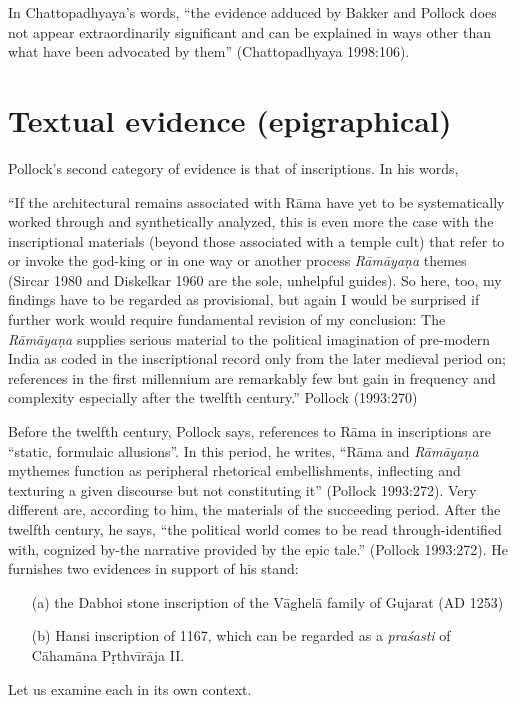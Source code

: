 In Chattopadhyaya’s words, “the evidence adduced by Bakker and Pollock does not appear extraordinarily significant and can be explained in ways other than what have been advocated by them” (Chattopadhyaya 1998:106). 

\section{Textual evidence (epigraphical)}\label{sec3.2}

Pollock’s second category of evidence is that of inscriptions. In his words, 

\begin{myquote}
“If the architectural remains associated with Rāma have yet to be systematically worked through and synthetically analyzed, this is even more the case with the inscriptional materials (beyond those associated with a temple cult) that refer to or invoke the god-king or in one way or another process {\sl Rāmāyaṇa} themes (Sircar 1980 and Diskelkar 1960 are the sole, unhelpful guides). So here, too, my findings have to be regarded as provisional, but again I would be surprised if further work would require fundamental revision of my conclusion: The {\sl Rāmāyaṇa} supplies serious material to the political imagination of pre-modern India as coded in the inscriptional record only from the later medieval period on; references in the first millennium are remarkably few but gain in frequency and complexity especially after the twelfth century.”
\hfill Pollock (1993:270)
\end{myquote}

Before the twelfth century, Pollock says, references to Rāma in inscriptions are “static, formulaic allusions”. In this period, he writes, “Rāma and {\sl Rāmāyaṇa} mythemes function as peripheral rhetorical embellishments, inflecting and texturing a given discourse but not constituting it” (Pollock 1993:272). Very different are, according to him, the materials of the succeeding period. After the twelfth century, he says, “the political world comes to be read through-identified with, cognized by-the narrative provided by the epic tale.” (Pollock 1993:272). He furnishes two evidences in support of his stand: 
\begin{itemize}
\item[(a)] the Dabhoi stone inscription of the Vāghelā family of Gujarat (AD 1253) 
\item[(b)] Hansi inscription of 1167, which can be regarded as a {\sl praśasti} of Cāhamāna Pṛthvīrāja II. 
\end{itemize}
Let us examine each in its own context. 

